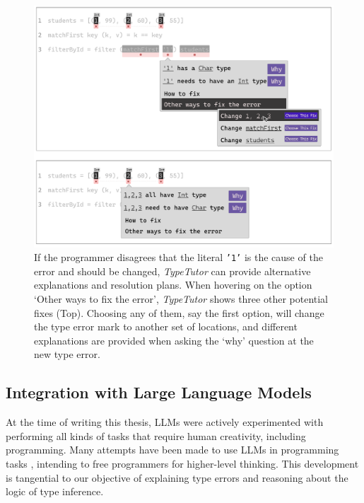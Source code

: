 \begin{figure}[hbt]
  \includegraphics[width=\linewidth]{WhatIf}
  \caption{
      \label{fig:what-if}
      If the programmer disagrees that the literal \texttt{'1'} is the cause of the error and should be changed, \textit{TypeTutor} can provide alternative explanations and resolution plans. When hovering on the option `Other ways to fix the error', \textit{TypeTutor} shows three other potential fixes (Top). Choosing any of them, say the first option, will change the type error mark to another set of locations, and different explanations are provided when asking the `why' question at the new type error.
    }
\end{figure}


\subsection{Integration with Large Language Models}
At the time of writing this thesis, LLMs were actively experimented with performing all kinds of tasks that require human creativity, including programming. Many attempts have been made to use LLMs in programming tasks \cite{Shi2024-bj}, intending to free programmers for higher-level thinking. This development is tangential to our objective of explaining type errors and reasoning about the logic of type inference. 

